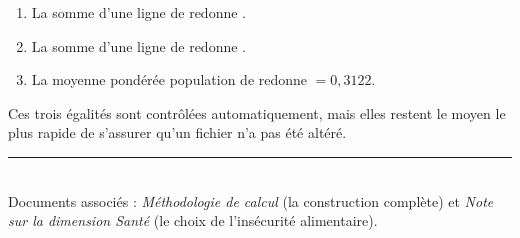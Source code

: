 \documentclass[11pt,a4paper]{article}
\begin{document}
\begin{retenir}
\begin{enumerate}
  \item La somme d'une ligne de  redonne .
  \item La somme d'une ligne de  redonne .
  \item La moyenne pondérée population de  redonne \ipm{} $= 0{,}3122$.
\end{enumerate}
Ces trois égalités sont contrôlées automatiquement, mais elles restent le moyen le plus rapide de
s'assurer qu'un fichier n'a pas été altéré.
\end{retenir}

\vfill
\noindent\rule{\linewidth}{0.4pt}\\[2pt]
\small
Documents associés : \emph{Méthodologie de calcul} (la construction complète) et \emph{Note sur la
dimension Santé} (le choix de l'insécurité alimentaire).
\end{document}
